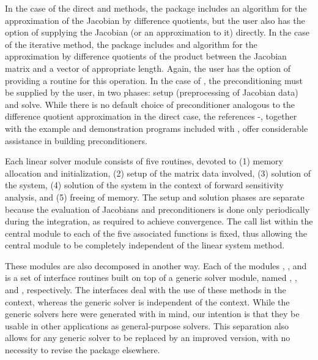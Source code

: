In the case of the direct {\cvdense} and {\cvband} methods, the package includes
an algorithm for the approximation of the Jacobian by difference
quotients, but the user also has the option of supplying the Jacobian
(or an approximation to it) directly. In the case of the iterative
{\cvspgmr} method, the package includes and algorithm for the approximation
by difference quotients of the product between the Jacobian matrix and
a vector of appropriate length. Again, the user has the option of providing
a routine for this operation.
In  the case of {\cvspgmr}, 
the preconditioning must be supplied by the user, in two phases: 
setup (preprocessing of Jacobian data) and solve.
While there is no default
choice of preconditioner analogous to the difference quotient
approximation in the direct case, the references
\cite{BrHi89}-\cite{By92}, together with
the example and demonstration programs included with {\cvodes}, offer
considerable assistance in building preconditioners.

Each {\cvodes} linear solver module consists of five routines, devoted to (1)
memory allocation and initialization, (2) setup of the matrix data
involved, (3) solution of the system, (4) solution of the system in the
context of forward sensitivity analysis, and (5) freeing of memory.  The
setup and solution phases are separate because the evaluation of
Jacobians and preconditioners is done only periodically during the
integration, as required to achieve convergence. The call list within
the central {\cvodes} module to each of the five associated functions is
fixed, thus allowing the central module to be completely independent
of the linear system method.

These modules are also decomposed in another way.
Each of the modules {\cvdense}, {\cvband}, and {\cvspgmr} is a set of 
interface routines built on top of a generic solver module, 
named {\dense}, {\band}, and {\spgmr}, respectively.  
The interfaces deal with the use of these methods in the {\cvodes} context, 
whereas the generic solver is independent of the context.
While the generic solvers here were generated with {\sundials} in mind, our
intention is that they be usable in other applications as
general-purpose solvers.  This separation also allows for any generic
solver to be replaced by an improved version, with no necessity to
revise the {\cvodes} package elsewhere.

